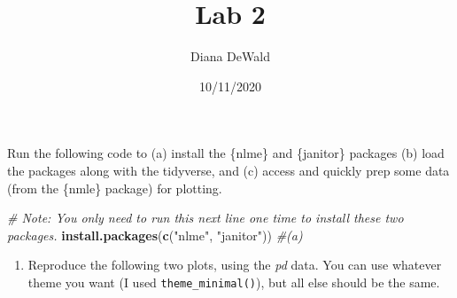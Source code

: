 \documentclass[
]{article}
\title{Lab 2}
\author{Diana DeWald}
\date{10/11/2020}
\newenvironment{Shaded}{\begin{snugshade}}{\end{snugshade}}
\newcommand{\CommentTok}[1]{\textcolor[rgb]{0.56,0.35,0.01}{\textit{#1}}}
\newcommand{\DataTypeTok}[1]{\textcolor[rgb]{0.13,0.29,0.53}{#1}}
\newcommand{\KeywordTok}[1]{\textcolor[rgb]{0.13,0.29,0.53}{\textbf{#1}}}
\newcommand{\NormalTok}[1]{#1}
\newcommand{\OperatorTok}[1]{\textcolor[rgb]{0.81,0.36,0.00}{\textbf{#1}}}
\newcommand{\StringTok}[1]{\textcolor[rgb]{0.31,0.60,0.02}{#1}}
\providecommand{\tightlist}{%
  \setlength{\itemsep}{0pt}\setlength{\parskip}{0pt}}
\begin{document}
\maketitle

Run the following code to (a) install the \{nlme\} and \{janitor\}
packages (b) load the packages along with the tidyverse, and (c) access
and quickly prep some data (from the \{nmle\} package) for plotting.

\begin{Shaded}
\begin{Highlighting}[]
\CommentTok{# Note: You only need to run this next line one time to install these two packages.}
\KeywordTok{install.packages}\NormalTok{(}\KeywordTok{c}\NormalTok{(}\StringTok{"nlme"}\NormalTok{, }\StringTok{"janitor"}\NormalTok{)) }\CommentTok{#(a)}
\end{Highlighting}
\end{Shaded}

\begin{Shaded}
\end{Shaded}

\begin{enumerate}
\def\labelenumi{\arabic{enumi}.}
\tightlist
\item
  Reproduce the following two plots, using the \emph{pd} data. You can
  use whatever theme you want (I used \texttt{theme\_minimal()}), but
  all else should be the same.
\end{enumerate}
\end{document}
